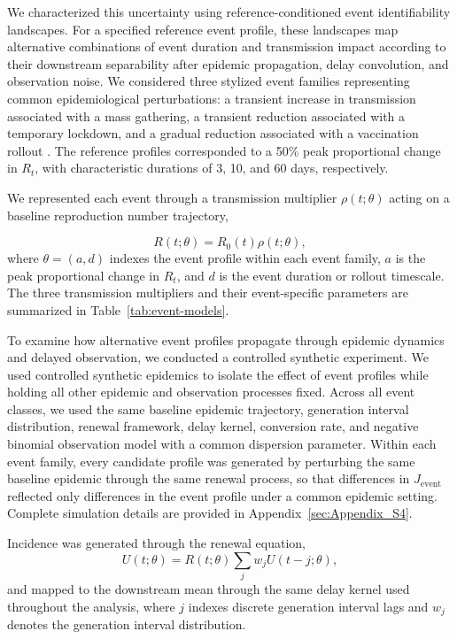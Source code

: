 We characterized this uncertainty using reference-conditioned event identifiability landscapes. For a specified reference event profile, these landscapes map alternative combinations of event duration and transmission impact according to their downstream separability after epidemic propagation, delay convolution, and observation noise. We considered three stylized event families representing common epidemiological perturbations: a transient increase in transmission associated with a mass gathering, a transient reduction associated with a temporary lockdown, and a gradual reduction associated with a vaccination rollout \cite{brauner2021inferring,flaxman2020estimating,bubar2021model}. The reference profiles corresponded to a 50\% peak proportional change in $R_t$, with characteristic durations of 3, 10, and 60 days, respectively.

We represented each event through a transmission multiplier \(\rho(t;\theta)\) acting on a baseline reproduction number trajectory,

\begin{equation}
R(t;\theta)
=
R_0(t)\rho(t;\theta),
\label{eq:event-Rt}
\end{equation}
where \(\theta=(a,d)\) indexes the event profile within each event family, \(a\) is the peak proportional change in \(R_t\), and \(d\) is the event duration or rollout timescale. The three transmission multipliers and their event-specific parameters are summarized in Table~\ref{tab:event-models}. 

To examine how alternative event profiles propagate through epidemic dynamics and delayed observation, we conducted a controlled synthetic experiment. We used controlled synthetic epidemics to isolate the effect of event profiles while holding all other epidemic and observation processes fixed. Across all event classes, we used the same baseline epidemic trajectory, generation interval distribution, renewal framework, delay kernel, conversion rate, and negative binomial observation model with a common dispersion parameter. Within each event family, every candidate profile was generated by perturbing the same baseline epidemic through the same renewal process, so that differences in \(J_{\mathrm{event}}\) reflected only differences in the event profile under a common epidemic setting. Complete simulation details are provided in Appendix~\ref{sec:Appendix_S4}.

Incidence was generated through the renewal equation,
\begin{equation}
U(t;\theta)
=
R(t;\theta)
\sum_j w_j U(t-j;\theta),
\label{eq:event-renewal}
\end{equation}
and mapped to the downstream mean through the same delay kernel used throughout the analysis, where \(j\) indexes discrete generation interval lags and \(w_j\) denotes the generation interval distribution.

